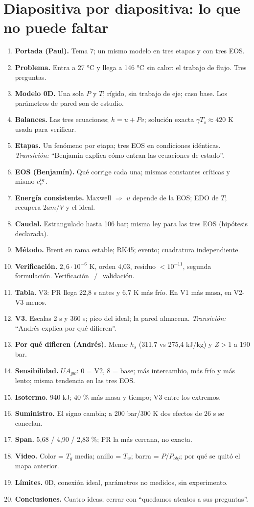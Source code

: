 \documentclass[11pt]{article}
\begin{document}
\section{Diapositiva por diapositiva: lo que no puede faltar}
\begin{enumerate}[leftmargin=*]
\item \textbf{Portada (Paul).} Tema 7; un mismo modelo en tres etapas y con tres EOS.
\item \textbf{Problema.} Entra a 27 °C y llega a 146 °C sin calor: el trabajo de flujo. Tres preguntas.
\item \textbf{Modelo 0D.} Una sola $P$ y $T$; rígido, sin trabajo de eje; caso base. Los parámetros de pared son de estudio.
\item \textbf{Balances.} Las tres ecuaciones; $h=u+Pv$; solución exacta $\gamma T_s\approx420$ K usada para verificar.
\item \textbf{Etapas.} Un fenómeno por etapa; tres EOS en condiciones idénticas. \emph{Transición:} ``Benjamín explica cómo entran las ecuaciones de estado''.
\item \textbf{EOS (Benjamín).} Qué corrige cada una; mismas constantes críticas y mismo $c_v^{ig}$.
\item \textbf{Energía consistente.} Maxwell $\Rightarrow$ $u$ depende de la EOS; EDO de $T$; recupera $2am/V$ y el ideal.
\item \textbf{Caudal.} Estrangulado hasta 106 bar; misma ley para las tres EOS (hipótesis declarada).
\item \textbf{Método.} Brent en rama estable; RK45; evento; cuadratura independiente.
\item \textbf{Verificación.} $2{,}6\cdot10^{-6}$ K, orden 4,03, residuo $<10^{-11}$, segunda formulación. Verificación $\neq$ validación.
\item \textbf{Tabla.} V3: PR llega 22,8 s antes y 6,7 K más frío. En V1 más masa, en V2-V3 menos.
\item \textbf{V3.} Escalas 2 s y 360 s; pico del ideal; la pared almacena. \emph{Transición:} ``Andrés explica por qué difieren''.
\item \textbf{Por qué difieren (Andrés).} Menor $h_s$ (311,7 vs 275,4 kJ/kg) y $Z>1$ a 190 bar.
\item \textbf{Sensibilidad.} $UA_{gw}$: 0 = V2, 8 = base; más intercambio, más frío y más lento; misma tendencia en las tres EOS.
\item \textbf{Isotermo.} 940 kJ; 40 \% más masa y tiempo; V3 entre los extremos.
\item \textbf{Suministro.} El signo cambia; a 200 bar/300 K dos efectos de 26 s se cancelan.
\item \textbf{Span.} 5,68 / 4,90 / 2,83 \%; PR la más cercana, no exacta.
\item \textbf{Video.} Color = $T_g$ media; anillo = $T_w$; barra = $P/P_{obj}$; por qué se quitó el mapa anterior.
\item \textbf{Límites.} 0D, conexión ideal, parámetros no medidos, sin experimento.
\item \textbf{Conclusiones.} Cuatro ideas; cerrar con ``quedamos atentos a sus preguntas''.
\end{enumerate}
\end{document}
